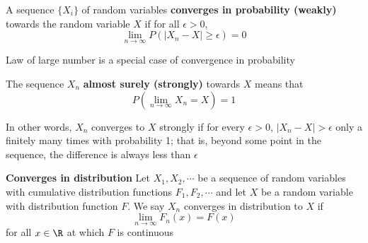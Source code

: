 \documentclass[11pt]{article}
\begin{document}
\begin{defn*}
  A sequence $\{ X_i \}$ of random variables \textbf{converges in probability (weakly)} towards the random variable $X$ if for all $\epsilon > 0$,
  \[
    \lim_{n \to \infty} P(|X_n - X| \geq \epsilon) = 0
  \]
  \begin{rem}
    Law of large number is a special case of convergence in probability
  \end{rem}
\end{defn*}

\begin{defn*}
  The sequence $X_n$ \textbf{almost surely (strongly)} towards $X$ means that
  \[
    P(\lim_{n\to\infty} X_n = X) = 1
  \]
  \begin{rem}
    In other words, $X_n$ converges to $X$ strongly if for every $\epsilon >0$, $|X_n - X| > \epsilon$ only a finitely many times with probability 1; that is, beyond some point in the sequence, the difference is always less than $\epsilon$
  \end{rem}
\end{defn*}


\begin{defn*}
  \textbf{Converges in distribution} Let $X_1, X_2, \cdots$ be a sequence of random variables with cumulative distribution functions $F_1, F_2,\cdots$ and let $X$ be a random variable with distribution function $F$. We say $X_n$ converges in distribution to $X$ if
  \[
    \lim_{n\to\infty} F_n (x) = F(x)
  \]
  for all $x\in\R$ at which $F$ is continuous
\end{defn*}
\end{document}
